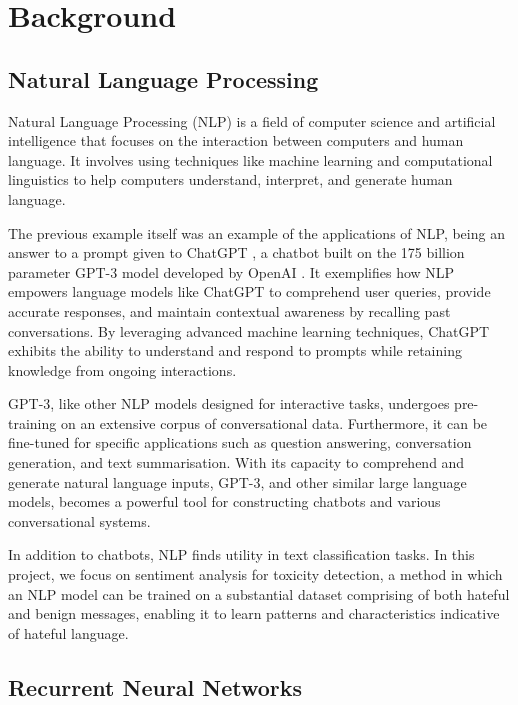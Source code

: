 \chapter{Background}

\section{Natural Language Processing}

Natural Language Processing (NLP) is a field of computer science and artificial intelligence that focuses on the interaction between computers and human language. It involves using techniques like machine learning and computational linguistics to help computers understand, interpret, and generate human language.

The previous example itself was an example of the applications of NLP, being an answer to a prompt given to ChatGPT \cite{ChatGPT}, a chatbot built on the 175 billion parameter GPT-3 model developed by OpenAI \cite{gpt_3}. It exemplifies how NLP empowers language models like ChatGPT to comprehend user queries, provide accurate responses, and maintain contextual awareness by recalling past conversations. By leveraging advanced machine learning techniques, ChatGPT exhibits the ability to understand and respond to prompts while retaining knowledge from ongoing interactions.

GPT-3, like other NLP models designed for interactive tasks, undergoes pre-training on an extensive corpus of conversational data. Furthermore, it can be fine-tuned for specific applications such as question answering, conversation generation, and text summarisation. With its capacity to comprehend and generate natural language inputs, GPT-3, and other similar large language models, becomes a powerful tool for constructing chatbots and various conversational systems.

In addition to chatbots, NLP finds utility in text classification tasks. In this project, we focus on sentiment analysis for toxicity detection, a method in which an NLP model can be trained on a substantial dataset comprising of both hateful and benign messages, enabling it to learn patterns and characteristics indicative of hateful language.

\section{Recurrent Neural Networks}

